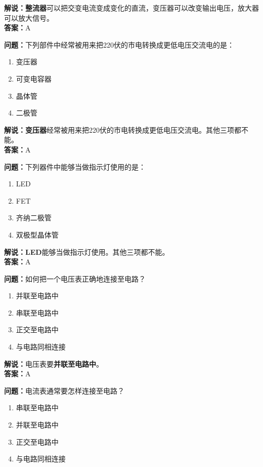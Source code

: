 \textbf{解说：整流器}可以把交变电流变成变化的直流，变压器可以改变输出电压，放大器可以放大信号。\\\textbf{答案：}A%



\textbf{问题：}下列部件中经常被用来把220伏的市电转换成更低电压交流电的是：

\begin{enumerate}[label=\Alph*), leftmargin=1cm]
	\item 变压器
	\item 可变电容器
	\item 晶体管
	\item 二极管
\end{enumerate}

\textbf{解说：变压器}经常被用来把220伏的市电转换成更低电压交流电。其他三项都不能。\\\textbf{答案：}A%

\textbf{问题：}下列器件中能够当做指示灯使用的是：

\begin{enumerate}[label=\Alph*), leftmargin=1cm]
	\item LED
	\item FET
	\item 齐纳二极管
	\item 双极型晶体管
\end{enumerate}

\textbf{解说：LED}能够当做指示灯使用。其他三项都不能。\\\textbf{答案：}A%

\textbf{问题：}如何把一个电压表正确地连接至电路？

\begin{enumerate}[label=\Alph*), leftmargin=1cm]
	\item 并联至电路中
	\item 串联至电路中
	\item 正交至电路中
	\item 与电路同相连接
\end{enumerate}

\textbf{解说：}电压表要\textbf{并联至电路中}。\\\textbf{答案：}A%


\textbf{问题：}电流表通常要怎样连接至电路？

\begin{enumerate}[label=\Alph*), leftmargin=1cm]
	\item 串联至电路中
	\item 并联至电路中
	\item 正交至电路中
	\item 与电路同相连接
\end{enumerate}

